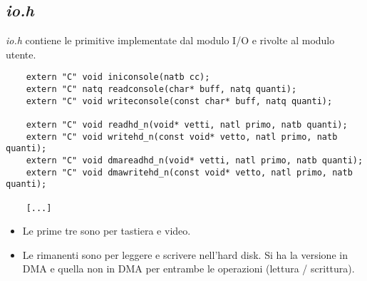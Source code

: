 \subsection{\emph{io.h}}
\emph{io.h} contiene le primitive implementate dal modulo I/O e rivolte al modulo utente.
\small
\begin{verbatim}
	extern "C" void iniconsole(natb cc);
	extern "C" natq readconsole(char* buff, natq quanti);
	extern "C" void writeconsole(const char* buff, natq quanti);
	
	extern "C" void readhd_n(void* vetti, natl primo, natb quanti);
	extern "C" void writehd_n(const void* vetto, natl primo, natb quanti);
	extern "C" void dmareadhd_n(void* vetti, natl primo, natb quanti);
	extern "C" void dmawritehd_n(const void* vetto, natl primo, natb quanti);
	
	[...]
\end{verbatim}
\normalsize
\begin{itemize}
	\item Le prime tre sono per tastiera e video.
	\item Le rimanenti sono per leggere e scrivere nell'hard disk. Si ha la versione in DMA e quella non in DMA per entrambe le operazioni (lettura / scrittura).
\end{itemize}
